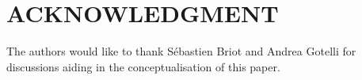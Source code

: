 \documentclass[letterpaper, 10 pt, conference]{ieeeconf}  %
\begin{document}























\section*{ACKNOWLEDGMENT}
The authors would like to thank Sébastien Briot and Andrea Gotelli for discussions aiding in the conceptualisation of this paper.





\end{document}
